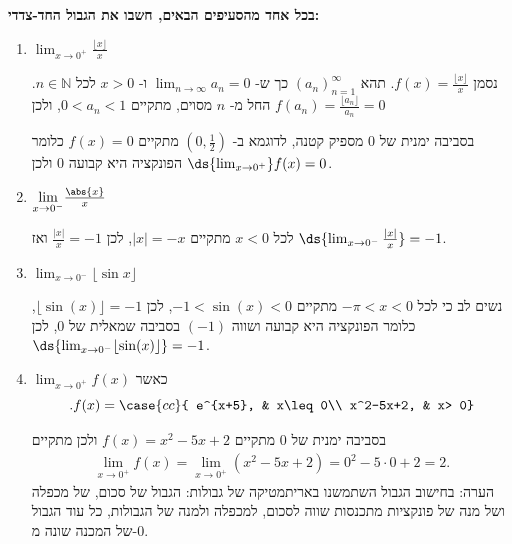 \textbf{
בכל אחד מהסעיפים הבאים,
חשבו
את הגבול החד-צדדי:}
\begin{enumerate}
\item ${\displaystyle\lim_{x\to0^+}}\frac{\lfloor x\rfloor}{x}$
\ifsol
{}
\begin{solbox}
נסמן
$f(x)=\frac{\lfloor x\rfloor}{x}$.
תהא
$(a_n)_{n=1}^\infty$
כך ש-
$\displaystyle\lim_{n\to\infty}a_n=0$
ו-
$x>0$
לכל
$n\in\mathbb{N}$.
החל מ-
$n$
מסוים, מתקיים
$0<a_n<1$,
ולכן
$f(a_n)=\frac{\lfloor a_n\rfloor}{a_n}=0$

בסביבה ימנית של
$0$
מספיק קטנה, לדוגמא ב-
$(0,\tfrac{1}{2})$
מתקיים
$f(x)=0$
כלומר הפונקציה היא קבועה
$0$
ולכן
$\ds{\lim_{x\to 0^+}}f(x)=0$.
\end{solbox}
\fi

\item ${\displaystyle\lim_{x\to0^-}}\frac{\abs{x}}{x}$
\ifsol
\begin{solbox}
לכל
$x<0$
מתקיים
$|x|=-x$,
לכן
$\frac{|x|}{x}=-1$
ואז
$\ds{\lim_{x\to0^-}\frac{|x|}{x}}=-1$.
\end{solbox}
\fi

\item ${\displaystyle\lim_{x\to0^-}}\lfloor\sin x\rfloor$
\ifsol
{}
\begin{solbox}
נשים לב כי לכל
$-\pi<x<0$
מתקיים
$-1<\sin(x)<0$,
לכן
$\lfloor\sin(x)\rfloor=-1$,
כלומר הפונקציה היא קבועה ושווה
$(-1)$
בסביבה שמאלית של
$0$,
לכן
$\ds{\lim_{x\to0^-}\lfloor\sin(x)\rfloor}=-1$.
\end{solbox}
\fi

\item
${\displaystyle\lim_{x\to0^+}}f(x)$
כאשר
\[
.f(x) = \case{cc}{
       e^{x+5}, &  x\leq 0\\ x^2-5x+2, & x> 0}
\]
\ifsol
\begin{solbox}
בסביבה ימנית של
$0$
מתקיים
$f(x)=x^2-5x+2$
ולכן
מתקיים
\begin{align*}
    \lim_{x\to0^+}f(x)= \lim_{x\to0^+}(x^2-5x+2)
    = 0^2-5\cdot0+2
    = 2.
\end{align*}
הערה: בחישוב הגבול השתמשנו באריתמטיקה של גבולות: הגבול של סכום, של מכפלה ושל מנה של פונקציות מתכנסות שווה לסכום, למכפלה ולמנה של הגבולות, כל עוד הגבול של המכנה שונה מ-$0$.
\end{solbox}
\fi
\end{enumerate}
